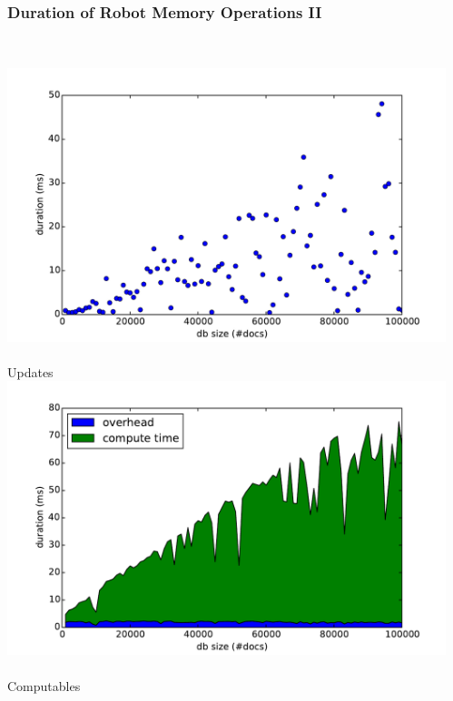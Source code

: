 \begin{frame}
  \frametitle{Duration of Robot Memory Operations II}
  \centering
  \begin{columns}
    \begin{column}{0.55\textwidth}
  \centering
    \small
    \\\vspace{-0.17cm}
    \includegraphics[width=\textwidth]{../thesis/plots/update-durations}\\
    \\\vspace{-0.08cm}
    Updates
    \\\vspace{-0.05cm}
    \includegraphics[width=\textwidth]{../thesis/plots/computable-durations}\\
    \\\vspace{-0.05cm}
    Computables
    \end{column}
    \begin{column}{0.55\textwidth}

\end{column}
\end{columns}
\end{frame}
